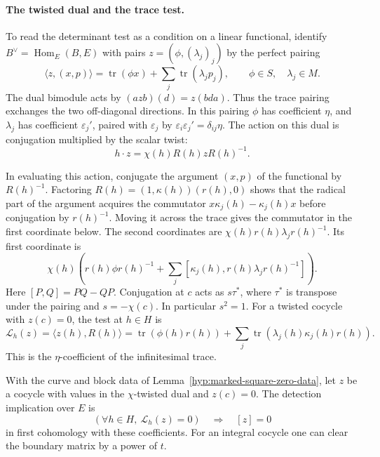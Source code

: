 \paragraph{The twisted dual and the trace test.}
To read the determinant test as a condition on a linear functional, identify \(B^\vee=\operatorname{Hom}_E(B,E)\) with pairs
\(z=(\phi,(\lambda_j)_j)\) by the perfect pairing
\[
 \langle z,(x,p)\rangle=\operatorname{tr}(\phi x)
     +\sum_j\operatorname{tr}(\lambda_jp_j),
 \qquad \phi\in S,\quad\lambda_j\in M .
\]
The dual bimodule acts by \((a z b)(d)=z(bda)\).
Thus the trace pairing exchanges the two off-diagonal
directions. In this pairing \(\phi\) has coefficient \(\eta\), and \(\lambda_j\) has coefficient
\(\varepsilon_j'\), paired with \(\varepsilon_j\) by
\(\varepsilon_i\varepsilon_j'=\delta_{ij}\eta\).
The action on this dual is conjugation multiplied by the scalar twist:
\[
 h\cdot z=\chi(h)R(h)zR(h)^{-1}.
\]

In evaluating this action, conjugate the argument \((x,p)\)
of the functional by \(R(h)^{-1}\). Factoring
\(R(h)=(1,\kappa(h))(r(h),0)\) shows that the radical
part of the argument acquires the commutator
\(x\kappa_j(h)-\kappa_j(h)x\) before conjugation by
\(r(h)^{-1}\). Moving it across the trace gives the
commutator in the first coordinate below. The second coordinates are
\(\chi(h)r(h)\lambda_jr(h)^{-1}\). Its first coordinate is
\[
 \chi(h)\left(r(h)\phi r(h)^{-1}
       +\sum_j[\kappa_j(h),r(h)\lambda_jr(h)^{-1}]\right).
\]
Here \([P,Q]=PQ-QP\). Conjugation at \(c\) acts as
\(s\tau^*\), where \(\tau^*\) is transpose under the pairing
and \(s=-\chi(c)\). In particular \(s^2=1\).
For a twisted cocycle with \(z(c)=0\), the test at \(h\in H\) is
\[
 \mathcal L_h(z)=\langle z(h),R(h)\rangle
  =\operatorname{tr}(\phi(h)r(h))
     +\sum_j\operatorname{tr}(\lambda_j(h)\kappa_j(h)r(h)).
 \tag{10}\label{eq:local-patch-10}
\]
This is the \(\eta\)-coefficient of the infinitesimal trace.

\begin{lemma}\label{lem:paired-trace-detection}
With the curve and block data of Lemma~\ref{hyp:marked-square-zero-data},
let \(z\) be a cocycle with values in the \(\chi\)-twisted dual and
\(z(c)=0\). The detection implication over \(E\) is
\[
  (\forall h\in H,\ \mathcal L_h(z)=0)\quad\Longrightarrow\quad [z]=0
\]
in first cohomology with these coefficients. For an integral cocycle
one can clear the boundary matrix by a power of \(t\).
\end{lemma}

